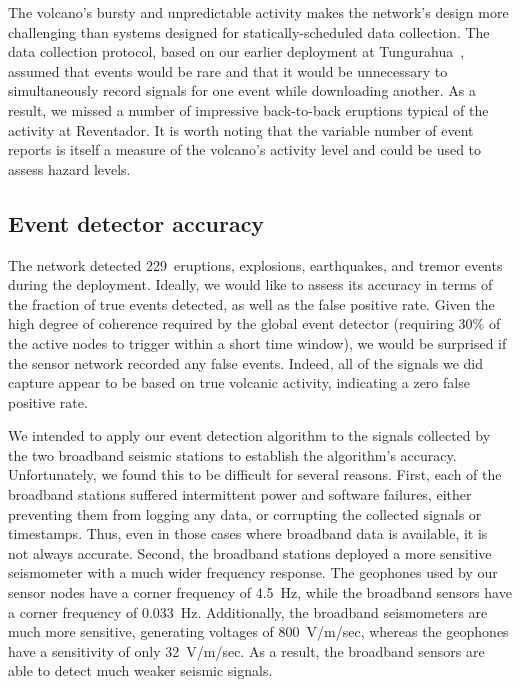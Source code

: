 The volcano's bursty and unpredictable activity makes the network's design
more challenging than systems designed for statically-scheduled data
collection.  The data collection protocol, based on our earlier deployment at
Tungurahua~\cite{volcano-ewsn05}, assumed that events would be rare and that
it would be unnecessary to simultaneously record signals for one event while
downloading another. As a result, we missed a number of impressive
back-to-back eruptions typical of the activity at Reventador. It is worth
noting that the variable number of event reports is itself a measure of the
volcano's activity level and could be used to assess hazard levels. 

\subsection{Event detector accuracy}
\label{sec-eventdetectaccuracy}


The network detected 229~eruptions, explosions, earthquakes, and tremor
events during the deployment. Ideally, we would like to assess its accuracy
in terms of the fraction of true events detected, as well as the false
positive rate. Given the high degree of coherence required by the global
event detector (requiring 30\% of the active nodes to trigger within a short
time window), we would be surprised if the sensor network recorded any false
events. Indeed, all of the signals we did capture appear to be based on true
volcanic activity, indicating a zero false positive rate.

We intended to apply our event detection algorithm to the signals collected
by the two broadband seismic stations to establish the algorithm's accuracy.
Unfortunately, we found this to be difficult for several reasons.  First,
each of the broadband stations suffered intermittent power and software
failures, either preventing them from logging any data, or corrupting the
collected signals or timestamps.  Thus, even in those cases where broadband
data is available, it is not always accurate. 
Second, the broadband stations deployed a more sensitive seismometer with a
much wider frequency response.  The geophones used by our sensor nodes have a
corner frequency of 4.5~Hz, while the broadband sensors have a corner
frequency of 0.033~Hz.  Additionally, the broadband seismometers are much
more sensitive, generating voltages of 800~V/m/sec, whereas the geophones
have a sensitivity of only 32~V/m/sec. As a result, the broadband sensors are
able to detect much weaker seismic signals.

